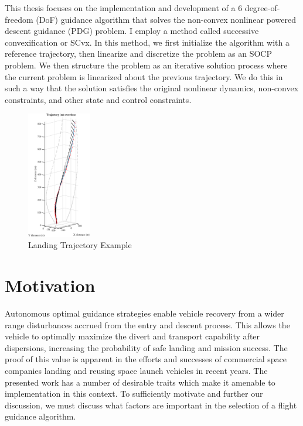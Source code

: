 This thesis focuses on the implementation and development of a 6 degree-of-freedom (DoF) guidance algorithm that solves the non-convex nonlinear powered descent guidance (PDG) problem. I employ a method called successive convexification or SCvx. In this method, we first initialize the algorithm with a reference trajectory, then linearize and discretize the problem as an SOCP problem. We then structure the problem as an iterative solution process where the current problem is linearized about the previous trajectory. We do this in such a way that the solution satisfies the original nonlinear dynamics, non-convex constraints, and other state and control constraints. 
\begin{figure}[!htbp] 
  \centering
  \includegraphics[width=0.25\textwidth]{figs/3dtraj_intro.eps}
  \caption{Landing Trajectory Example}
  \label{fig:intro}
 \end{figure}	



\section{Motivation}
Autonomous optimal guidance strategies enable vehicle recovery from a wider range disturbances accrued from the entry and descent process. This allows the vehicle to optimally maximize the divert and transport capability after dispersions, increasing the probability of safe landing and mission success. The proof of this value is apparent in the efforts and successes of commercial space companies landing and reusing space launch vehicles in recent years. The presented work has a number of desirable traits which make it amenable to implementation in this context. To sufficiently motivate and further our discussion, we must discuss what factors are important in the selection of a flight guidance algorithm.

